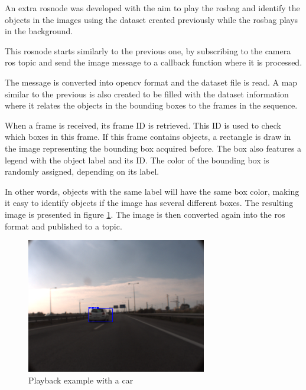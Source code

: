 An extra rosnode was developed with the aim to play the rosbag and identify the objects in the images using the dataset created previously while the rosbag plays in the background.

This rosnode starts similarly to the previous one, by subscribing to the camera \gls{ros} topic and send the image message to a callback function where it is processed. 

The message is converted into \gls{opencv} format and the dataset file is read. A map similar to the previous is also created to be filled with the dataset information where it relates the objects in the bounding boxes to the frames in the sequence. 

When a frame is received, its frame ID is retrieved. This ID is used to check which boxes in this frame. If this frame contains objects, a rectangle is draw in the image representing the bounding box acquired before. The box also features a legend with the object label and its ID. The color of the bounding box is randomly assigned, depending on its label. 

In other words, objects with the same label will have the same box color, making it easy to identify objects if the image has several different boxes. The resulting image is presented in figure \ref{fig:playback}. The image is then converted again into the \gls{ros} format and published to a topic.

\begin{figure}[htp]
	
	\centering
	\includegraphics[width=0.7\textwidth]{caplabel/imgs/playback.png}
	
	\caption{Playback example with a car}
	\label{fig:playback}
	
\end{figure}







